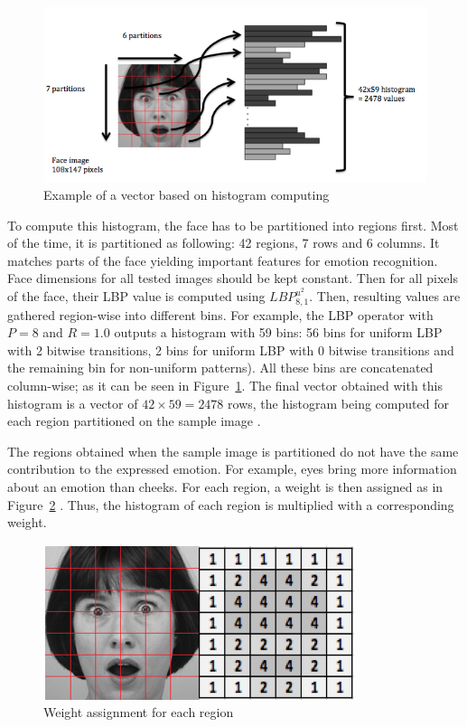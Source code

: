 \begin{figure}[!h]
\begin{center}
\noindent \includegraphics[scale=0.7]{figures/lbp_histogram} 
\newline
\caption{Example of a vector based on histogram computing}
\label{lbp_histogram}
\end{center} 
\end{figure}

\noindent To compute this histogram, the face has to be partitioned into regions first. Most of the time, it is partitioned as following: 42 regions, 7 rows and 6 columns. It matches parts of the face yielding important features for emotion recognition. Face dimensions for all tested images should be kept constant. Then for all pixels of the face, their LBP value is computed using $ LBP_{8,1}^{u^2} $. Then, resulting values are gathered region-wise into different bins. For example, the LBP operator with $ P = 8 $ and $ R = 1.0 $ outputs a histogram with 59 bins: 56 bins for uniform LBP with 2 bitwise transitions, 2 bins for uniform LBP with 0 bitwise transitions and the remaining bin for non-uniform patterns). All these bins are concatenated column-wise; as it can be seen in Figure~\ref{lbp_histogram}. The final vector obtained with this histogram is a vector of $ 42\times59 = 2478 $ rows, the histogram being computed for each region partitioned on the sample image \cite{GAN08}.
\newline

\noindent The regions obtained when the sample image is partitioned do not have the same contribution to the expressed emotion. For example, eyes bring more information about an emotion than cheeks. For each region, a weight is then assigned as in Figure~\ref{lbp_region_weight} \cite{GAN08}. Thus, the histogram of each region is multiplied with a corresponding weight.
\newline

\begin{figure}[!h]
\begin{center}
\noindent \includegraphics[scale=0.6]{figures/lbp_region_weight} 
\newline
\caption{Weight assignment for each region}
\label{lbp_region_weight}
\end{center} 
\end{figure}
